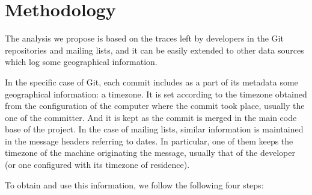 \documentclass{sig-alternate-05-2015}
\begin{document}
\section{Methodology}
\label{sec:methodology}

The analysis we propose is based on the traces left by developers in the Git repositories and mailing lists, and it can be easily extended to other data sources which log some geographical information.


In the specific case of Git, each commit includes as a part of its metadata some geographical information: a timezone. It is set according to the timezone obtained from the configuration of the computer where the commit took place, usually the one of the committer. And it is kept as the commit is merged in the main code base of the project. In the case of mailing lists, similar information is maintained in the message headers referring to dates. In particular, one of them keeps the timezone of the machine originating the message, usually that of the developer (or one configured with its timezone of residence).

To obtain and use this information, we follow the following four steps:
\end{document}

